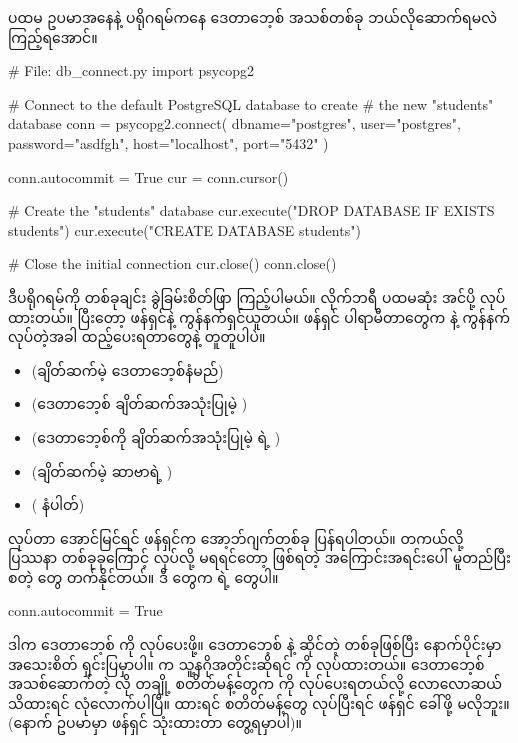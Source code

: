 ပထမ ဥပမာအနေနဲ့  ပရိုဂရမ်ကနေ  ဒေတာဘေ့စ် အသစ်တစ်ခု ဘယ်လိုဆောက်ရမလဲ ကြည့်ရအောင်။ 
%
\begin{py}
# File: db_connect.py
import psycopg2

# Connect to the default PostgreSQL database to create 
# the new "students" database
conn = psycopg2.connect(
    dbname="postgres",
    user="postgres",
    password="asdfgh",
    host="localhost",
    port="5432"
)

conn.autocommit = True
cur = conn.cursor()

# Create the "students" database
cur.execute("DROP DATABASE IF EXISTS students")
cur.execute("CREATE DATABASE students")

# Close the initial connection
cur.close()
conn.close()
\end{py}
%

ဒီပရိုဂရမ်ကို တစ်ခုချင်း ခွဲခြမ်းစိတ်ဖြာ ကြည့်ပါမယ်။  လိုက်ဘရီ ပထမဆုံး အင်ပို့ လုပ်ထားတယ်။ ပြီးတော့  ဖန်ရှင်နဲ့ ကွန်နက်ရှင်ယူတယ်။  ဖန်ရှင် ပါရာမီတာတွေက  နဲ့ ကွန်နက်လုပ်တဲ့အခါ ထည့်ပေးရတာတွေနဲ့ တူတူပါပဲ။
%
\begin{itemize}
    \item {} (ချိတ်ဆက်မဲ့ ဒေတာဘေ့စ်နံမည်) 
    \item {} (ဒေတာဘေ့စ် ချိတ်ဆက်အသုံးပြုမဲ့ ) 
    \item {} (ဒေတာဘေ့စ်ကို ချိတ်ဆက်အသုံးပြုမဲ့  ရဲ့ )
    \item {} (ချိတ်ဆက်မဲ့ ဆာဗာရဲ့ )
    \item {} ( နံပါတ်)
\end{itemize}
%

 လုပ်တာ အောင်မြင်ရင်  ဖန်ရှင်က  အော့ဘ်ဂျက်တစ်ခု ပြန်ရပါတယ်။ တကယ်လို့ ပြဿနာ တစ်ခုခုကြောင့်  လုပ်လို့ မရရင်တော့ ဖြစ်ရတဲ့ အကြောင်းအရင်းပေါ် မူတည်ပြီး \fEn{,}  စတဲ့  တွေ တက်နိုင်တယ်။ ဒီ  တွေက   ရဲ့  တွေပါ။


%
\begin{py}
conn.autocommit = True
\end{py}
%
ဒါက ဒေတာဘေ့စ်  ကို  လုပ်ပေးဖို့။ ဒေတာဘေ့စ်  နဲ့ ဆိုင်တဲ့  တစ်ခုဖြစ်ပြီး နောက်ပိုင်းမှာ အသေးစိတ် ရှင်းပြမှာပါ။  က သူ့နဂိုအတိုင်းဆိုရင်   ကို  လုပ်ထားတယ်။ ဒေတာဘေ့စ် အသစ်ဆောက်တဲ့  လို တချို့  စတိတ်မန့်တွေက  ကို  လုပ်ပေးရတယ်လို့ လောလောဆယ် သိထားရင် လုံလောက်ပါပြီ။  ထားရင်  စတိတ်မန့်တွေ  လုပ်ပြီးရင်  ဖန်ရှင် ခေါ်ဖို့ မလိုဘူး။ (နောက် ဥပမာမှာ  ဖန်ရှင် သုံးထားတာ တွေ့ရမှာပါ)။

